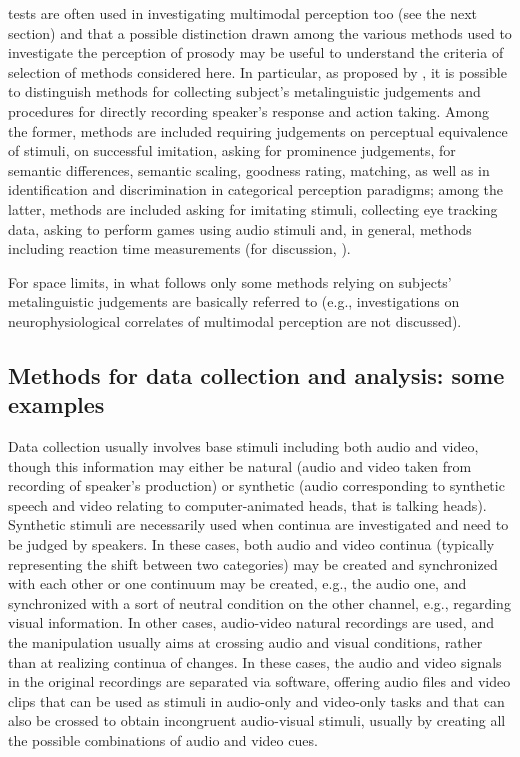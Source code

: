 \documentclass[output=paper]{langsci/langscibook}
\begin{document}
tests are often used in investigating multimodal perception too (see the next section) and that a possible distinction drawn among the various methods used to investigate the perception of prosody may be useful to understand the criteria of selection of methods considered here. In particular, as proposed by \citet{GiliFivela2008book}, it is possible to distinguish methods for collecting subject’s metalinguistic judgements and procedures for directly recording speaker’s response and action taking. Among the former, methods are included requiring judgements on perceptual equivalence of stimuli, on successful imitation, asking for prominence judgements, for semantic differences, semantic scaling, goodness rating, matching, as well as in identification and discrimination in categorical perception paradigms; among the latter, methods are included asking for imitating stimuli, collecting eye tracking data, asking to perform games using audio stimuli and, in general, methods including reaction time measurements (for discussion, \citealt{GiliFivela2008book}). 

For space limits, in what follows only some methods relying on subjects’ metalinguistic judgements are basically referred to (e.g., investigations on neurophysiological correlates of multimodal perception are not discussed). 
 
\subsection{Methods for data collection and analysis: some examples} \label{sec:gil:3:2}
Data collection usually involves base stimuli including both audio and video, though this information may either be natural (audio and video taken from recording of speaker’s production) or synthetic (audio corresponding to synthetic \linebreak speech and video relating to computer-animated heads, that is talking heads). Synthetic stimuli are necessarily used when continua are investigated and need to be judged by speakers. In these cases, both audio and video continua (typically representing the shift between two categories) may be created and synchronized with each other or one continuum may be created, e.g., the audio one, and synchronized with a sort of neutral condition on the other channel, e.g., regarding visual information. In other cases, audio-video natural recordings are used, and the manipulation usually aims at crossing audio and visual conditions, rather than at realizing continua of changes. In these cases, the audio and video signals in the original recordings are separated via software, offering audio files and video clips that can be used as stimuli in audio-only and video-only tasks and that can also be crossed to obtain incongruent audio-visual stimuli, usually by creating all the possible combinations of audio and video cues. 
\end{document}
